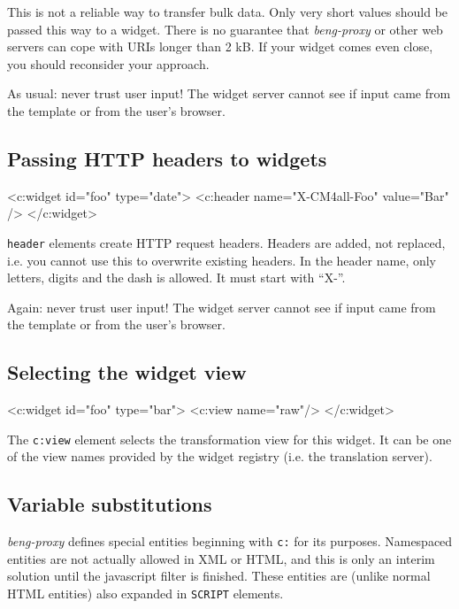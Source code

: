 \documentclass[a4paper,12pt]{article}
\begin{document}
This is not a reliable way to transfer bulk data.  Only very short
values should be passed this way to a widget.  There is no guarantee
that \emph{beng-proxy} or other web servers can cope with URIs longer
than 2 kB.  If your widget comes even close, you should reconsider
your approach.

As usual: never trust user input!  The widget server cannot see if
input came from the template or from the user's browser.

\subsection{Passing HTTP headers to widgets}

\begin{verbatim*}
<c:widget id="foo" type="date">
  <c:header name="X-CM4all-Foo" value="Bar" />
</c:widget>
\end{verbatim*}

\texttt{header} elements create HTTP request headers.  Headers are
added, not replaced, i.e. you cannot use this to overwrite existing
headers.  In the header name, only letters, digits and the dash is
allowed.  It must start with ``X-''.

Again: never trust user input!  The widget server cannot see if input
came from the template or from the user's browser.

\subsection{Selecting the widget view}

\begin{verbatim*}
<c:widget id="foo" type="bar">
  <c:view name="raw"/>
</c:widget>
\end{verbatim*}

The \texttt{c:view} element selects the transformation view for this
widget.  It can be one of the view names provided by the widget
registry (i.e. the translation server).

\subsection{Variable substitutions}
\label{entities}

\emph{beng-proxy} defines special entities beginning with \texttt{c:}
for its purposes.  Namespaced entities are not actually allowed in XML
or HTML, and this is only an interim solution until the javascript
filter is finished.  These entities are (unlike normal HTML entities)
also expanded in \texttt{SCRIPT} elements.
\end{document}
